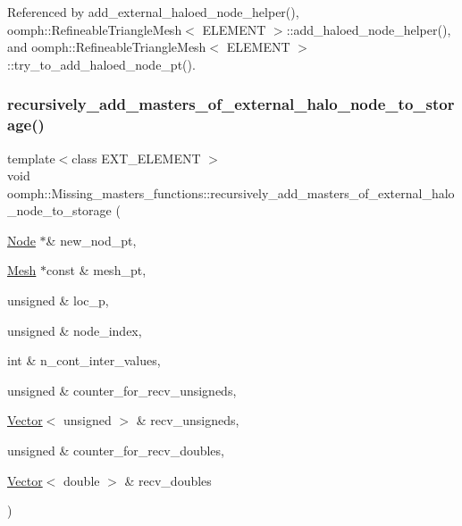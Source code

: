 Referenced by add\+\_\+external\+\_\+haloed\+\_\+node\+\_\+helper(), oomph\+::\+Refineable\+Triangle\+Mesh$<$ E\+L\+E\+M\+E\+N\+T $>$\+::add\+\_\+haloed\+\_\+node\+\_\+helper(), and oomph\+::\+Refineable\+Triangle\+Mesh$<$ E\+L\+E\+M\+E\+N\+T $>$\+::try\+\_\+to\+\_\+add\+\_\+haloed\+\_\+node\+\_\+pt().

\mbox{\label{namespaceoomph_1_1Missing__masters__functions_a5aeedca2c5268a414d83fa7cfd023f14}} 
\subsubsection{\texorpdfstring{recursively\+\_\+add\+\_\+masters\+\_\+of\+\_\+external\+\_\+halo\+\_\+node\+\_\+to\+\_\+storage()}{recursively\_add\_masters\_of\_external\_halo\_node\_to\_storage()}}
{\footnotesize\ttfamily template$<$class E\+X\+T\+\_\+\+E\+L\+E\+M\+E\+NT $>$ \\
void oomph\+::\+Missing\+\_\+masters\+\_\+functions\+::recursively\+\_\+add\+\_\+masters\+\_\+of\+\_\+external\+\_\+halo\+\_\+node\+\_\+to\+\_\+storage (\begin{DoxyParamCaption}\item[{\hyperlink{classoomph_1_1Node}{Node} $\ast$\&}]{new\+\_\+nod\+\_\+pt,  }\item[{\hyperlink{classoomph_1_1Mesh}{Mesh} $\ast$const \&}]{mesh\+\_\+pt,  }\item[{unsigned \&}]{loc\+\_\+p,  }\item[{unsigned \&}]{node\+\_\+index,  }\item[{int \&}]{n\+\_\+cont\+\_\+inter\+\_\+values,  }\item[{unsigned \&}]{counter\+\_\+for\+\_\+recv\+\_\+unsigneds,  }\item[{\hyperlink{classoomph_1_1Vector}{Vector}$<$ unsigned $>$ \&}]{recv\+\_\+unsigneds,  }\item[{unsigned \&}]{counter\+\_\+for\+\_\+recv\+\_\+doubles,  }\item[{\hyperlink{classoomph_1_1Vector}{Vector}$<$ double $>$ \&}]{recv\+\_\+doubles }\end{DoxyParamCaption})}



